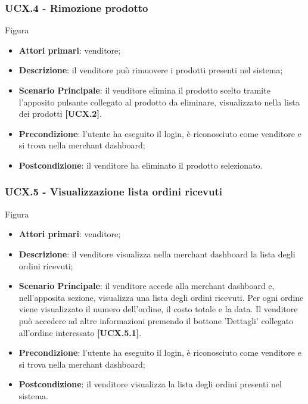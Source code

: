 \subsubsection{UCX.4 - Rimozione prodotto}
Figura \\
\begin{itemize}
\item \textbf{Attori primari}: venditore;
\item \textbf{Descrizione}: il venditore può rimuovere i prodotti presenti nel sistema;
\item \textbf{Scenario Principale}: il venditore elimina il prodotto scelto tramite l'apposito pulsante collegato al prodotto da eliminare, visualizzato nella lista dei prodotti \textbf{[UCX.2]}.
\item \textbf{Precondizione}: l'utente ha eseguito il login, è riconosciuto come venditore e si trova nella merchant dashboard;
\item \textbf{Postcondizione}: il venditore ha eliminato il prodotto selezionato.
\end{itemize}

\subsubsection{UCX.5 - Visualizzazione lista ordini ricevuti}
Figura \\
\begin{itemize}
\item \textbf{Attori primari}: venditore;
\item \textbf{Descrizione}: il venditore visualizza nella merchant dashboard la lista degli ordini ricevuti;
\item \textbf{Scenario Principale}: il venditore accede alla merchant dashboard e, nell'apposita sezione, visualizza una lista degli ordini ricevuti. Per ogni ordine viene visualizzato il numero dell'ordine, il costo totale e la data. Il venditore può accedere ad altre informazioni premendo il bottone 'Dettagli' collegato all'ordine interessato \textbf{[UCX.5.1]}.
\item \textbf{Precondizione}: l'utente ha eseguito il login, è riconosciuto come venditore e si trova nella merchant dashboard;
\item \textbf{Postcondizione}: il venditore visualizza la lista degli ordini presenti nel sistema.
\end{itemize}

